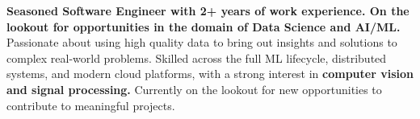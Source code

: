\documentclass[../main.tex]{subfiles}
\begin{document}
\textbf{Seasoned Software Engineer with 2+ years of work experience. On the lookout for opportunities in the domain of Data Science and AI/ML.}
Passionate about using high quality data to bring out insights and solutions to complex real-world problems.
Skilled across the full ML lifecycle, distributed systems, and modern cloud platforms, with a strong interest in \textbf{computer vision and signal processing.}
Currently on the lookout for new opportunities to contribute to meaningful projects.
\end{document}
